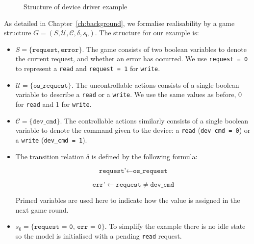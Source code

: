 \begin{figure}
    \centering
    \caption{Structure of device driver example}
    \label{fig:exampleStructural}
\end{figure}

As detailed in Chapter~\ref{ch:background}, we formalise realisability by a game structure $G = (S, \mathcal{U}, \mathcal{C}, \delta, s_0)$. The structure for our example is:

\begin{itemize}
    \item $S = \{ \texttt{request}, \texttt{error} \} $. The game consists of two boolean variables to denote the current request, and whether an error has occurred. We use \texttt{request = 0} to represent a \texttt{read} and \texttt{request = 1} for \texttt{write}.
    \item $\mathcal{U} = \{ \texttt{os\_request} \} $. The uncontrollable actions consists of a single boolean variable to describe a \texttt{read} or a \texttt{write}. We use the same values as before, 0 for \texttt{read} and 1 for \texttt{write}.
    \item $\mathcal{C} = \{ \texttt{dev\_cmd} \}$. The controllable actions similarly consists of a single boolean variable to denote the command given to the device: a \texttt{read} (\texttt{dev\_cmd = 0}) or a \texttt{write} (\texttt{dev\_cmd = 1}).
    \item The transition relation $\delta$ is defined by the following formula:

        $$ \texttt{request'} \gets \texttt{os\_request} $$

        $$ \texttt{err'} \gets \texttt{request} \neq \texttt{dev\_cmd} $$

        Primed variables are used here to indicate how the value is assigned in the next game round.

    \item $s_0 = \{ \texttt{request = 0, err = 0} \}$. To simplify the example there is no idle state so the model is initialised with a pending \texttt{read} request.

\end{itemize}

